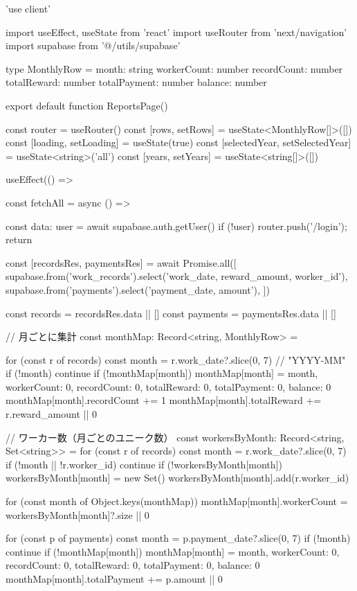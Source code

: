 'use client'

import { useEffect, useState } from 'react'
import { useRouter } from 'next/navigation'
import { supabase } from '@/utils/supabase'

type MonthlyRow = {
  month: string
  workerCount: number
  recordCount: number
  totalReward: number
  totalPayment: number
  balance: number
}

export default function ReportsPage() {
  const router = useRouter()
  const [rows, setRows] = useState<MonthlyRow[]>([])
  const [loading, setLoading] = useState(true)
  const [selectedYear, setSelectedYear] = useState<string>('all')
  const [years, setYears] = useState<string[]>([])

  useEffect(() => {
    const fetchAll = async () => {
      const { data: { user } } = await supabase.auth.getUser()
      if (!user) { router.push('/login'); return }

      const [recordsRes, paymentsRes] = await Promise.all([
        supabase.from('work_records').select('work_date, reward_amount, worker_id'),
        supabase.from('payments').select('payment_date, amount'),
      ])

      const records = recordsRes.data || []
      const payments = paymentsRes.data || []

      // 月ごとに集計
      const monthMap: Record<string, MonthlyRow> = {}

      for (const r of records) {
        const month = r.work_date?.slice(0, 7) // "YYYY-MM"
        if (!month) continue
        if (!monthMap[month]) {
          monthMap[month] = { month, workerCount: 0, recordCount: 0, totalReward: 0, totalPayment: 0, balance: 0 }
        }
        monthMap[month].recordCount += 1
        monthMap[month].totalReward += r.reward_amount || 0
      }

      // ワーカー数（月ごとのユニーク数）
      const workersByMonth: Record<string, Set<string>> = {}
      for (const r of records) {
        const month = r.work_date?.slice(0, 7)
        if (!month || !r.worker_id) continue
        if (!workersByMonth[month]) workersByMonth[month] = new Set()
        workersByMonth[month].add(r.worker_id)
      }

      for (const month of Object.keys(monthMap)) {
        monthMap[month].workerCount = workersByMonth[month]?.size || 0
      }

      for (const p of payments) {
        const month = p.payment_date?.slice(0, 7)
        if (!month) continue
        if (!monthMap[month]) {
          monthMap[month] = { month, workerCount: 0, recordCount: 0, totalReward: 0, totalPayment: 0, balance: 0 }
        }
        monthMap[month].totalPayment += p.amount || 0
      }

}}}
